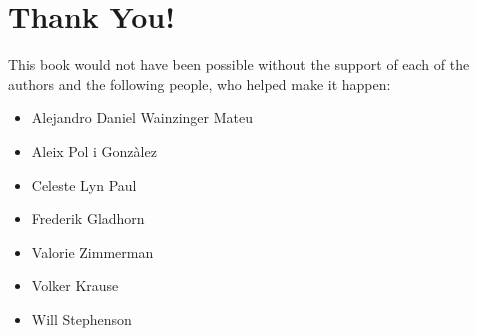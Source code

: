 \section*{Thank You!}

This book would not have been possible without the support of each of the
authors and the following people, who helped make it happen:
\begin{itemize}
 \item Alejandro Daniel Wainzinger Mateu
 \item Aleix Pol i Gonzàlez
 \item Celeste Lyn Paul
 \item Frederik Gladhorn
 \item Valorie Zimmerman
 \item Volker Krause
 \item Will Stephenson
\end{itemize}

\newpage
